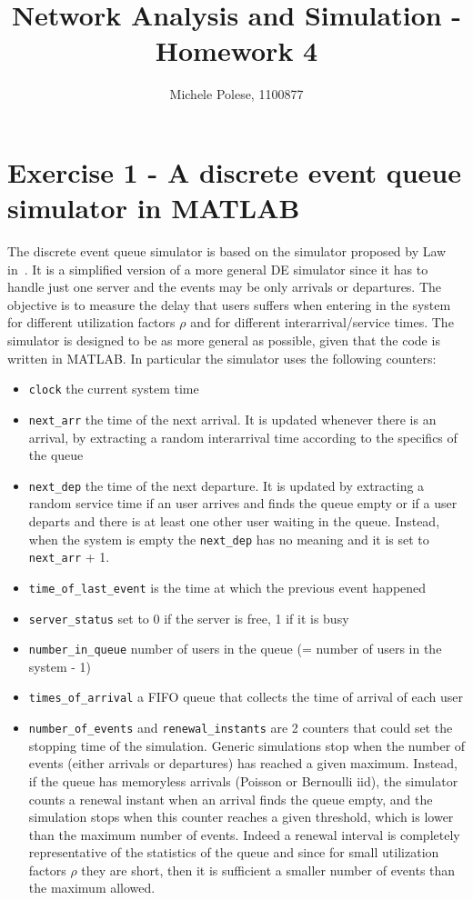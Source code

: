 \documentclass[10pt]{article}
\begin{document}
\title{Network Analysis and Simulation - Homework 4}
\author{Michele Polese, 1100877}

\maketitle

\section*{Exercise 1 - A discrete event queue simulator in MATLAB}
The discrete event queue simulator is based on the simulator proposed by Law in~\cite{law}. It is a simplified version of a more general DE simulator since it has to handle just one server and the events may be only arrivals or departures. The objective is to measure the delay that users suffers when entering in the system for different utilization factors $\rho$ and for different interarrival/service times. The simulator is designed to be as more general as possible, given that the code is written in MATLAB. In particular the simulator uses the following counters:
\begin{itemize}
\item \texttt{clock} the current system time
\item \texttt{next\_arr} the time of the next arrival. It is updated whenever there is an arrival, by extracting a random interarrival time according to the specifics of the queue
\item \texttt{next\_dep} the time of the next departure. It is updated by extracting a random service time if an user arrives and finds the queue empty or if a user departs and there is at least one other user waiting in the queue. Instead, when the system is empty the \texttt{next\_dep} has no meaning and it is set to \texttt{next\_arr} + 1.
\item \texttt{time\_of\_last\_event} is the time at which the previous event happened
\item \texttt{server\_status} set to 0 if the server is free, 1 if it is busy
\item \texttt{number\_in\_queue} number of users in the queue (= number of users in the system - 1)
\item \texttt{times\_of\_arrival} a FIFO queue that collects the time of arrival of each user
\item \texttt{number\_of\_events} and \texttt{renewal\_instants} are 2 counters that could set the stopping time of the simulation. Generic simulations stop when the number of events (either arrivals or departures) has reached a given maximum. Instead, if the queue has memoryless arrivals (Poisson or Bernoulli iid), the simulator counts a renewal instant when an arrival finds the queue empty, and the simulation stops when this counter reaches a given threshold, which is lower than the maximum number of events. Indeed a renewal interval is completely representative of the statistics of the queue and since for small utilization factors $\rho$ they are short, then it is sufficient a smaller number of events than the maximum allowed. 
\end{itemize}
\end{document}
